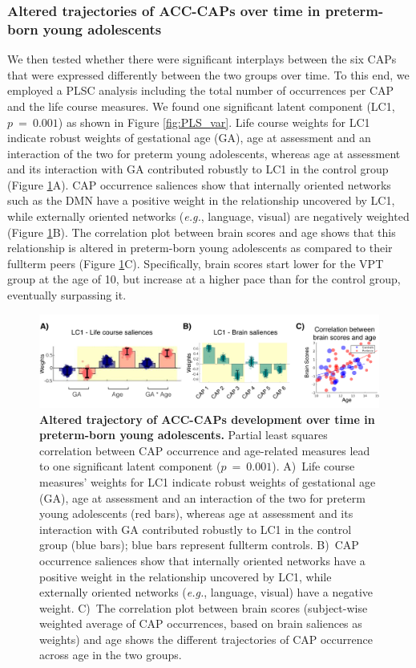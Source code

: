 \subsubsection*{Altered trajectories of ACC-CAPs over time in preterm-born young adolescents} We then tested whether there were significant interplays between the six CAPs that were expressed differently between the two groups over time. To this end, we employed a PLSC analysis including the total number of occurrences per CAP and the life course measures. We found one significant latent component (LC1, $p~=~0.001$) as shown in Figure \ref{fig:PLS_var}. Life course weights for LC1  indicate robust weights of gestational age (GA), age at assessment and an interaction of the two for preterm young adolescents, whereas age at assessment and its interaction with GA contributed robustly to LC1 in the control group (Figure \ref{fig:PLS_CAPs}A). CAP occurrence saliences show that internally oriented networks such as the DMN have a positive weight in the relationship uncovered by LC1, while externally oriented networks (\textit{e.g.}, language, visual) are negatively weighted (Figure \ref{fig:PLS_CAPs}B). The correlation plot between brain scores and age shows that this relationship is altered in preterm-born young adolescents as compared to their fullterm peers (Figure \ref{fig:PLS_CAPs}C). Specifically, brain scores start lower for the VPT group at the age of 10, but increase at a higher pace than for the control group, eventually surpassing it. 



\begin{figure}[h]
\centering\includegraphics[width=1\linewidth]{images/Ch3/Fig4_CAPs_PLS_results.png}
\caption{\textbf{Altered trajectory of ACC-CAPs development over time in preterm-born young adolescents.} Partial least squares correlation between CAP occurrence and age-related measures lead to one significant latent component ($p~=~0.001$).   A)~Life course measures' weights for LC1  indicate robust weights of gestational age (GA), age at assessment and an interaction of the two for preterm young adolescents (red bars), whereas age at assessment and its interaction with GA contributed robustly to LC1 in the control group (blue bars); blue bars represent fullterm controls. B)~CAP occurrence saliences show that internally oriented networks have a positive weight in the relationship uncovered by LC1, while externally oriented networks (\textit{e.g.}, language, visual) have a negative weight.  C)~The correlation plot between brain scores (subject-wise weighted average of CAP occurrences, based on brain saliences as weights) and age shows the different trajectories of CAP occurrence across age in the two groups.} \label{fig:PLS_CAPs}
\end{figure}




